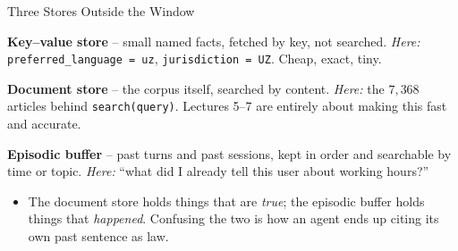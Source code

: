 \begin{frame}{Three Stores Outside the Window}
\begin{rldefinition}
\textbf{Key--value store} -- small named facts, fetched by key, not searched. \emph{Here:} \texttt{preferred\_language = uz}, \texttt{jurisdiction = UZ}. Cheap, exact, tiny.

\smallskip
\textbf{Document store} -- the corpus itself, searched by content. \emph{Here:} the $7{,}368$ articles behind \texttt{search(query)}. Lectures 5--7 are entirely about making this fast and accurate.

\smallskip
\textbf{Episodic buffer} -- past turns and past sessions, kept in order and searchable by time or topic. \emph{Here:} ``what did I already tell this user about working hours?''
\end{rldefinition}
\pause
\begin{itemize}
  \item The document store holds things that are \emph{true}; the episodic buffer holds things that \emph{happened}. Confusing the two is how an agent ends up citing its own past sentence as law.
\end{itemize}
\end{frame}

